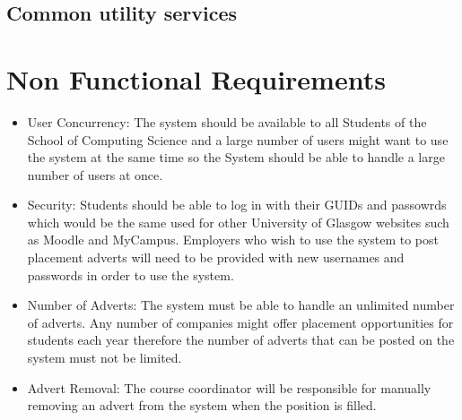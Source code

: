 \documentclass{l3deliverable}
\begin{document}
\subsection{Common utility services}
\begin{UseCaseTemplate}
\UseCaseRationale{}
\UseCaseIncludes{}
\UseCaseNonFunctionalRequirements{}
\UseCaseScenarios{}
\UseCaseRisks{}
\end{UseCaseTemplate}
\begin{UseCaseTemplate}
\UseCaseIncludes{}
\UseCaseNonFunctionalRequirements{}
\UseCaseScenarios{}
\UseCaseRisks{}
\end{UseCaseTemplate}
\section{Non Functional Requirements}
\begin{itemize}
\item User Concurrency: The system should be available to all Students of the School of Computing Science and a large number of users might want to use the system at the same time so the System should be able to handle a large number of users at once.
\item Security: Students should be able to log in with their GUIDs and passowrds which would be the same used for other University of Glasgow websites such as Moodle and MyCampus. Employers who wish to use the system to post placement adverts will need to be provided with new usernames and passwords in order to use the system.
\item Number of Adverts: The system must be able to handle an unlimited number of adverts. Any number of companies might offer placement opportunities for students each year therefore the number of adverts that can be posted on the system must not be limited.
\item Advert Removal: The course coordinator will be responsible for manually removing an advert from the system when the position is filled.
\end{itemize}
\end{document}
